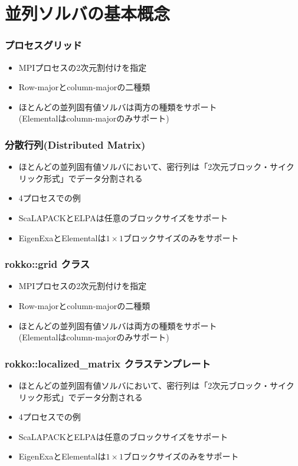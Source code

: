 \section{並列ソルバの基本概念}

\begin{frame}
  \frametitle{プロセスグリッド}
  \begin{itemize}
  \item MPIプロセスの2次元割付けを指定
  \item Row-majorとcolumn-majorの二種類
  \item ほとんどの並列固有値ソルバは両方の種類をサポート \\
    (Elementalはcolumn-majorのみサポート)
  \end{itemize}
\end{frame}

\begin{frame}
  \frametitle{分散行列(Distributed Matrix)}
  \begin{itemize}
  \item ほとんどの並列固有値ソルバにおいて、密行列は「2次元ブロック・サイクリック形式」でデータ分割される
  \item 4プロセスでの例
  \item ScaLAPACKとELPAは任意のブロックサイズをサポート
  \item EigenExaとElementalは$1 \times 1$ブロックサイズのみをサポート
  \end{itemize}
\end{frame}

\begin{frame}
  \frametitle{rokko::grid クラス}
  \begin{itemize}
  \item MPIプロセスの2次元割付けを指定
  \item Row-majorとcolumn-majorの二種類
  \item ほとんどの並列固有値ソルバは両方の種類をサポート \\
    (Elementalはcolumn-majorのみサポート)
  \end{itemize}
\end{frame}

\begin{frame}
  \frametitle{rokko::localized\_matrix クラステンプレート}
  \begin{itemize}
  \item ほとんどの並列固有値ソルバにおいて、密行列は「2次元ブロック・サイクリック形式」でデータ分割される
  \item 4プロセスでの例
  \item ScaLAPACKとELPAは任意のブロックサイズをサポート
  \item EigenExaとElementalは$1 \times 1$ブロックサイズのみをサポート
  \end{itemize}
\end{frame}

